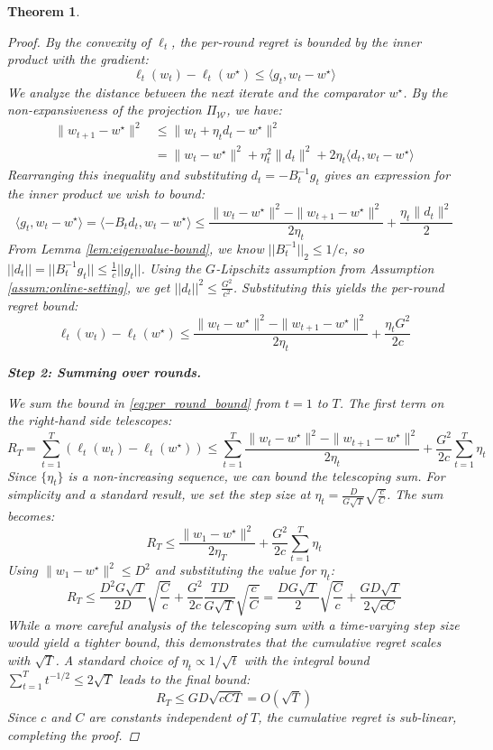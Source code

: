 \documentclass[a4paper,12pt]{article}
\newtheorem{theorem}{Theorem}
\begin{document}
\begin{theorem}
\begin{proof}
By the convexity of $\ell_t$, the per-round regret is bounded by the inner product with the gradient:
$$
\ell_t(w_t) - \ell_t(w^\star) \le \langle g_t, w_t - w^\star \rangle
$$
We analyze the distance between the next iterate and the comparator $w^\star$. By the non-expansiveness of the projection $\Pi_{\mathcal{W}}$, we have:
\begin{align*}
    \|w_{t+1} - w^\star\|^2 &\le \|w_t + \eta_t d_t - w^\star\|^2 \\
    &= \|w_t - w^\star\|^2 + \eta_t^2\|d_t\|^2 + 2\eta_t \langle d_t, w_t - w^\star \rangle
\end{align*}
Rearranging this inequality and substituting $d_t = -B_t^{-1}g_t$ gives an expression for the inner product we wish to bound:
$$
\langle g_t, w_t - w^\star \rangle = \langle -B_t d_t, w_t - w^\star \rangle \le \frac{\|w_t - w^\star\|^2 - \|w_{t+1} - w^\star\|^2}{2\eta_t} + \frac{\eta_t\|d_t\|^2}{2}
$$
From Lemma \ref{lem:eigenvalue-bound}, we know $||B_t^{-1}||_2 \le 1/c$, so $||d_t|| = ||B_t^{-1}g_t|| \le \frac{1}{c}||g_t||$. Using the $G$-Lipschitz assumption from Assumption \ref{assum:online-setting}, we get $||d_t||^2 \le \frac{G^2}{c^2}$. Substituting this yields the per-round regret bound:
\begin{equation} \label{eq:per_round_bound}
\ell_t(w_t) - \ell_t(w^\star) \le \frac{\|w_t - w^\star\|^2 - \|w_{t+1} - w^\star\|^2}{2\eta_t} + \frac{\eta_t G^2}{2c}
\end{equation}

\textbf{Step 2: Summing over rounds.}

We sum the bound in \eqref{eq:per_round_bound} from $t=1$ to $T$. The first term on the right-hand side telescopes:
$$
R_T = \sum_{t=1}^T (\ell_t(w_t) - \ell_t(w^\star)) \le \sum_{t=1}^T \frac{\|w_t - w^\star\|^2 - \|w_{t+1} - w^\star\|^2}{2\eta_t} + \frac{G^2}{2c}\sum_{t=1}^T \eta_t
$$
Since $\{\eta_t\}$ is a non-increasing sequence, we can bound the telescoping sum. For simplicity and a standard result, we set the step size at $\eta_t = \frac{D}{G\sqrt{T}}\sqrt{\frac{c}{C}}$. The sum becomes:
$$
R_T \le \frac{\|w_1 - w^\star\|^2}{2\eta_T} + \frac{G^2}{2c}\sum_{t=1}^T \eta_t
$$
Using $\|w_1 - w^\star\|^2 \le D^2$ and substituting the value for $\eta_t$:
$$
R_T \le \frac{D^2 G \sqrt{T}}{2D}\sqrt{\frac{C}{c}} + \frac{G^2}{2c} \frac{TD}{G\sqrt{T}}\sqrt{\frac{c}{C}} = \frac{DG\sqrt{T}}{2}\sqrt{\frac{C}{c}} + \frac{GD\sqrt{T}}{2\sqrt{c C}}
$$
While a more careful analysis of the telescoping sum with a time-varying step size would yield a tighter bound, this demonstrates that the cumulative regret scales with $\sqrt{T}$. A standard choice of $\eta_t \propto 1/\sqrt{t}$ with the integral bound $\sum_{t=1}^T t^{-1/2} \le 2\sqrt{T}$ leads to the final bound:
$$
R_T \le GD\sqrt{cCT} = O(\sqrt{T})
$$
Since $c$ and $C$ are constants independent of $T$, the cumulative regret is sub-linear, completing the proof.
\end{proof}


\end{theorem}
\end{document}
